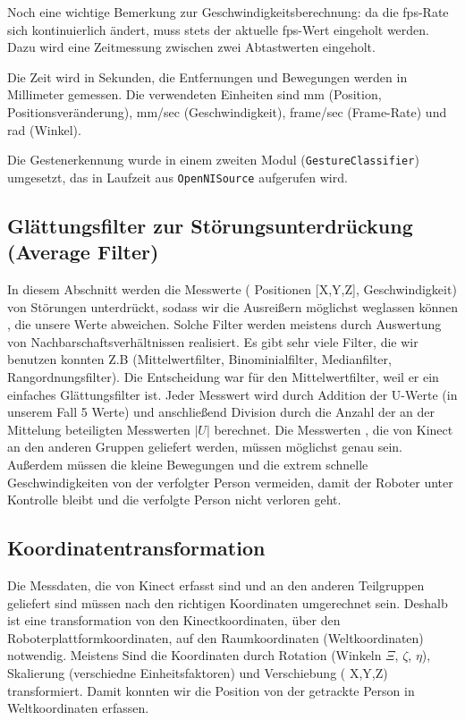 Noch eine wichtige Bemerkung zur Geschwindigkeitsberechnung: da die \gls{fps}-Rate
 sich kontinuierlich ändert, muss stets der aktuelle \gls{fps}-Wert eingeholt werden.
 Dazu wird eine Zeitmessung zwischen zwei Abtastwerten eingeholt.

Die Zeit wird in Sekunden, die Entfernungen und Bewegungen werden in Millimeter gemessen.
 Die verwendeten Einheiten sind mm (Position, Positionsveränderung), mm/sec
 (Geschwindigkeit), frame/sec (Frame-Rate) und rad (Winkel).

Die Gestenerkennung wurde in einem zweiten Modul (\lstinline{GestureClassifier})
umgesetzt, das in Laufzeit aus \lstinline{OpenNISource} aufgerufen wird.


\subsection{Glättungsfilter zur Störungsunterdrückung (Average Filter)}
\authorsection{\editorhamza}

In diesem Abschnitt werden die Messwerte ( Positionen [X,Y,Z], Geschwindigkeit) von Störungen unterdrückt, sodass wir die  Ausreißern möglichst weglassen  können , die unsere Werte abweichen. Solche Filter werden meistens durch Auswertung von Nachbarschaftsverhältnissen realisiert. 
Es gibt sehr viele Filter, die wir benutzen konnten Z.B (Mittelwertfilter, Binominialfilter, Medianfilter, Rangordnungsfilter). Die Entscheidung war für den Mittelwertfilter, weil er ein einfaches Glättungsfilter ist. Jeder Messwert wird durch Addition der U-Werte (in unserem Fall 5 Werte)  und anschließend Division durch die Anzahl der an der Mittelung beteiligten Messwerten $|U|$ berechnet.
Die Messwerten , die von Kinect an den anderen Gruppen geliefert werden, müssen möglichst genau sein. Außerdem müssen die kleine Bewegungen und die extrem schnelle Geschwindigkeiten von der verfolgter Person vermeiden, damit der Roboter unter Kontrolle bleibt und die verfolgte Person nicht verloren geht.


\subsection{ Koordinatentransformation}
\authorsection{\editorhamza}

Die Messdaten, die von Kinect erfasst sind und an den anderen Teilgruppen geliefert sind müssen nach den richtigen Koordinaten umgerechnet sein. Deshalb ist eine transformation von den Kinectkoordinaten, über den Roboterplattformkoordinaten, auf den Raumkoordinaten (Weltkoordinaten) notwendig. Meistens Sind die Koordinaten durch Rotation (Winkeln $\Xi$, $\zeta$, $\eta$),  Skalierung (verschiedne Einheitsfaktoren) und  Verschiebung ( X,Y,Z) transformiert. Damit konnten wir die Position von der getrackte Person in Weltkoordinaten erfassen.


